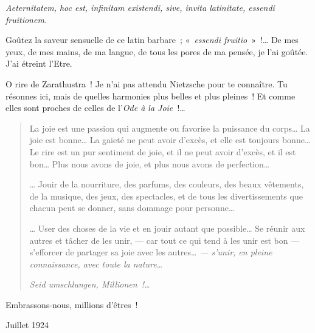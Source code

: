 \emph{Aeternitatem, hoc est, infinitam existendi, sive, invita
latinitate, essendi fruitionem.}

Goûtez la saveur sensuelle de ce latin barbare~; «~\emph{essendi
fruitio}~»~!\ldots{} De mes yeux, de mes mains, de ma langue, de tous les
pores de ma pensée, je l'ai goûtée. J'ai étreint l'Etre.

O rire de Zarathustra~! Je n'ai pas attendu Nietzsche pour te connaître.
Tu résonnes ici, mais de quelles harmonies plus belles et plus pleines~!
Et comme elles sont proches de celles de l'\emph{Ode à la Joie~}!\ldots{}

\begin{quote}
La joie est une passion qui augmente ou favorise la puissance du
corps\ldots{} La joie est bonne\ldots{} La gaieté ne peut avoir d'excès, et elle
est toujours bonne\ldots{}
Le rire est un pur sentiment de joie, et il ne
peut avoir d'excès, et il est bon\ldots{} Plus nous avons de joie, et plus
nous avons de perfection\ldots{}

\ldots{} Jouir de la nourriture, des parfums, des couleurs, des beaux
vêtements, de la musique, des jeux, des spectacles, et de tous les
divertissements que chacun peut se donner, sans dommage pour
personne\ldots{}

\ldots{} User des choses de la vie et en jouir autant que possible\ldots{}
Se réunir aux autres et tâcher de les unir, --- car tout ce qui
tend à les unir est bon --- s'efforcer de partager sa joie avec les
autres\ldots{} \emph{--- s'unir, en pleine
connaissance, avec toute la nature\ldots{}}

\emph{Seid umschlungen, Millionen~!\ldots{}}
\end{quote}

Embrassons-nous, millions d'êtres~!

\begin{flushright}
Juillet 1924
\end{flushright}